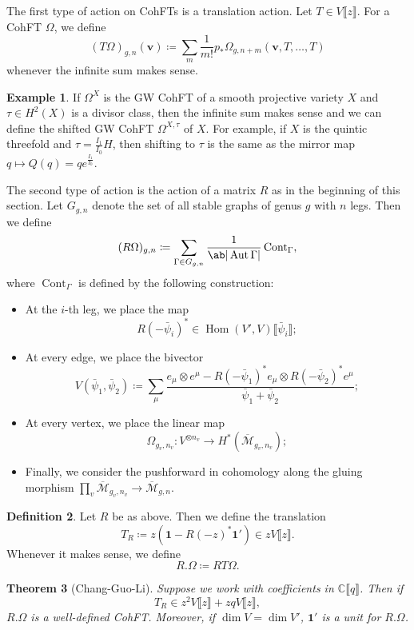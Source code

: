 \documentclass{amsart}
\newtheorem{thm}{Theorem}[section]
\theoremstyle{definition}
\newtheorem{defn}[thm]{Definition}
\newtheorem{exm}[thm]{Example}
\theoremstyle{remark}
\theoremstyle{plain}
\theoremstyle{definition}
\theoremstyle{remark}
\newcommand{\C}{\mathbb{C}}
\newcommand{\Mbar}{\overline{\mathcal{M}}}
\newcommand{\mbf}[1]{\mathbf{#1}}
\newcommand{\bv}{\mbf{v}}
\newcommand{\on}[1]{\operatorname{#1}}
\newcommand{\1}{\mathbf{1}}
\newcommand{\2}{\mathbf{2}}
\newcommand{\3}{\mathbf{3}}
\newcommand{\ps}[1]{\llbracket #1 \rrbracket}
\DeclareMathOperator{\Hom}{Hom}
\DeclareMathOperator{\Aut}{Aut}
\begin{document}
The first type of action on CohFTs is a translation action. Let $T \in V\ps{z}$. For a CohFT $\Omega$, we define
\[ (T\Omega)_{g,n}(\bv) \coloneqq \sum_m \frac{1}{m!} p_* \Omega_{g,n+m}(\bv, T,\ldots,T) \]
whenever the infinite sum makes sense.

\begin{exm}
    If $\Omega^X$ is the GW CohFT of a smooth projective variety $X$ and $\tau \in H^2(X)$ is a divisor class, then the infinite sum makes sense and we can define the shifted GW CohFT $\Omega^{X,\tau}$ of $X$. For example, if $X$ is the quintic threefold and $\tau = \frac{I_1}{I_0} H$, then shifting to $\tau$ is the same as the mirror map $q \mapsto Q(q) = q e^{\frac{I_1}{I_0}}$.
\end{exm}

The second type of action is the action of a matrix $R$ as in the beginning of this section. Let $G_{g,n}$ denote the set of all stable graphs of genus $g$ with $n$ legs. Then we define
\[ (R\Omega)_{g,n} \coloneqq \sum_{\Gamma \in G_{g,n}} \frac{1}{\ab|\Aut \Gamma|} \on{Cont}_{\Gamma}, \]
where $\on{Cont}_{\Gamma}$ is defined by the following construction:
\begin{itemize}
    \item At the $i$-th leg, we place the map 
        \[ R(-\bar{\psi}_i)^* \in \Hom(V',V) \ps{\bar{\psi}_i}; \]
    \item At every edge, we place the bivector
        \[ V(\bar{\psi}_1, \bar{\psi}_2) \coloneqq \sum_{\mu} \frac{e_{\mu} \otimes e^{\mu} - R(-\bar{\psi}_1)^* e_{\mu} \otimes R(-\bar{\psi}_2)^* e^{\mu}}{\bar{\psi}_1 + \bar{\psi}_2}; \]
    \item At every vertex, we place the linear map
        \[ \Omega_{g_v, n_v} \colon V^{\otimes n_v} \to H^*(\Mbar_{g_v, n_v}); \]
    \item Finally, we consider the pushforward in cohomology along the gluing morphism $\prod_v \Mbar_{g_v, n_v} \to \Mbar_{g,n}$.
\end{itemize}

\begin{defn}
    Let $R$ be as above. Then we define the translation
    \[ T_R \coloneqq z (\1 - R(-z)^* \1') \in z V\ps{z}. \]
    Whenever it makes sense, we define
    \[ R.\Omega \coloneqq RT\Omega. \]
\end{defn}

\begin{thm}[Chang-Guo-Li]
    Suppose we work with coefficients in $\C\ps{q}$. Then if
    \[ T_R \in z^2 V \ps{z} + zq V \ps{z}, \]
    $R.\Omega$ is a well-defined CohFT. Moreover, if $\dim V = \dim V'$, $\1'$ is a unit for $R.\Omega$.
\end{thm}
\end{document}
